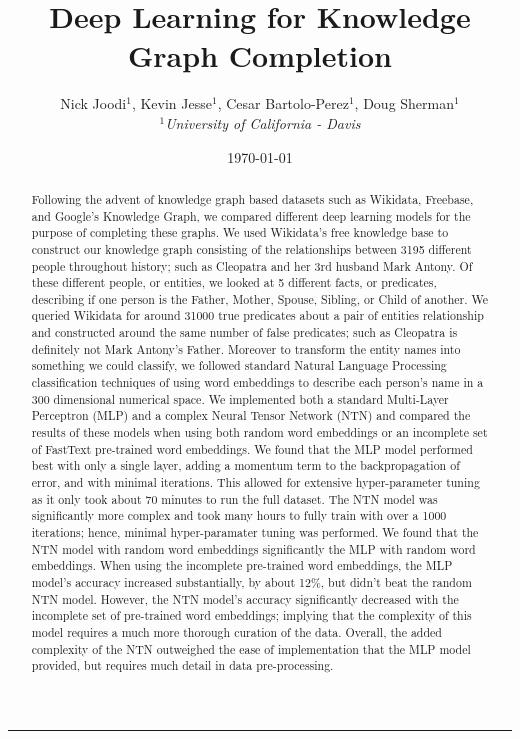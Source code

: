 \documentclass[11.5pt]{article}
\begin{document}
\title{Deep Learning for Knowledge Graph Completion}
\author{Nick Joodi$^1$, Kevin Jesse$^1$, Cesar Bartolo-Perez$^1$, Doug Sherman$^1$\\
	{\small
	\textit{$^1$University of California - Davis}}
} 
\date{\today}
\maketitle
\rule{\textwidth}{1pt}

\begin{abstract}
Following the advent of knowledge graph based datasets such as Wikidata, Freebase, and Google's Knowledge Graph, we compared different deep learning models for the purpose of completing these graphs. We used Wikidata's free knowledge base to construct our knowledge graph consisting of the relationships between 3195 different people throughout history; such as Cleopatra and her 3rd husband Mark Antony.  Of these different people, or entities, we looked at 5 different facts, or predicates, describing if one person is the Father, Mother, Spouse, Sibling, or Child of another. We queried Wikidata for around 31000 true predicates about a pair of entities relationship and constructed around the same number of false predicates; such as Cleopatra is definitely not Mark Antony's Father. Moreover to transform the entity names into something we could classify, we followed standard Natural Language Processing classification techniques of using word embeddings to describe each person's name in a 300 dimensional numerical space. We implemented both a standard Multi-Layer Perceptron (MLP) and a complex Neural Tensor Network (NTN) and compared the results of these models when using both random word embeddings or an incomplete set of FastText pre-trained word embeddings. We found that the MLP model performed best with only a single layer, adding a momentum term to the backpropagation of error, and with minimal iterations. This allowed for extensive hyper-parameter tuning as it only took about 70 minutes to run the full dataset. The NTN model was significantly more complex and took many hours to fully train with over a 1000 iterations; hence, minimal hyper-paramater tuning was performed. We found that the NTN model with random word embeddings significantly the MLP with random word embeddings. When using the incomplete pre-trained word embeddings, the MLP model's accuracy increased substantially, by about 12\%, but didn't beat the random NTN model. However, the NTN model's accuracy significantly decreased with the incomplete set of pre-trained word embeddings; implying that the complexity of this model requires a much more thorough curation of the data. Overall, the added complexity of the NTN outweighed the ease of implementation that the MLP model provided, but requires much detail in data pre-processing.

\end{abstract}
\end{document}
